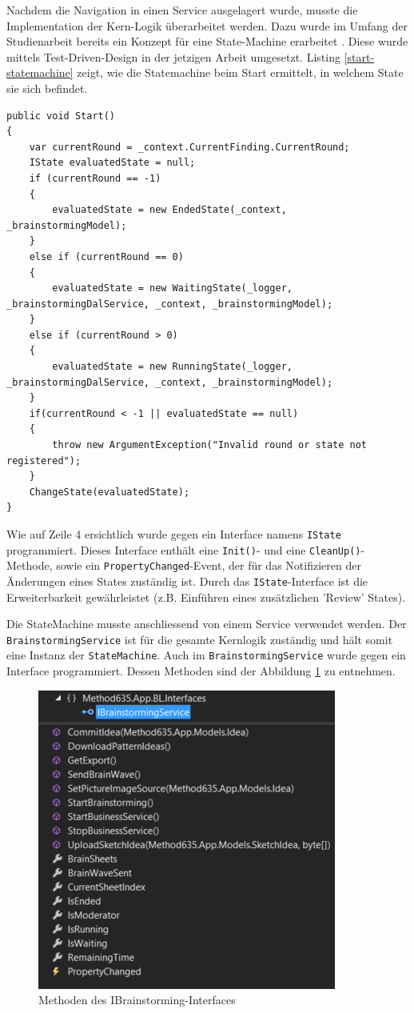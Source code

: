 Nachdem die Navigation in einen Service ausgelagert wurde, musste die Implementation der Kern-Logik überarbeitet werden. Dazu wurde im Umfang der Studienarbeit bereits ein Konzept für eine State-Machine erarbeitet \cite{methode635-sa}. Diese wurde mittels Test-Driven-Design in der jetzigen Arbeit umgesetzt. Listing \ref{start-statemachine} zeigt, wie die Statemachine beim Start ermittelt, in welchem State sie sich befindet.
\begin{lstlisting}[caption=Start der Klasse StateMachine, label=start-statemachine]
public void Start()
{
	var currentRound = _context.CurrentFinding.CurrentRound;
	IState evaluatedState = null;
	if (currentRound == -1)
	{
		evaluatedState = new EndedState(_context, _brainstormingModel);
	}
	else if (currentRound == 0)
	{
		evaluatedState = new WaitingState(_logger, _brainstormingDalService, _context, _brainstormingModel);
	}
	else if (currentRound > 0)
	{
		evaluatedState = new RunningState(_logger, _brainstormingDalService, _context, _brainstormingModel);
	}
	if(currentRound < -1 || evaluatedState == null)
	{
		throw new ArgumentException("Invalid round or state not registered");
	}
	ChangeState(evaluatedState);
}
\end{lstlisting}
Wie auf Zeile 4 ersichtlich wurde gegen ein Interface namens \texttt{IState} programmiert. Dieses Interface enthält eine \texttt{Init()}- und eine \texttt{CleanUp()}-Methode, sowie ein \texttt{PropertyChanged}-Event, der für das Notifizieren der Änderungen eines States zuständig ist. Durch das \texttt{IState}-Interface ist die Erweiterbarkeit gewährleistet (z.B. Einführen eines zusätzlichen 'Review' States). 

Die StateMachine musste anschliessend von einem Service verwendet werden. Der \texttt{BrainstormingService} ist für die gesamte Kernlogik zuständig und hält somit eine Instanz der \texttt{StateMachine}. Auch im \texttt{BrainstormingService} wurde gegen ein Interface programmiert. Dessen Methoden sind der Abbildung \ref{fig:ibrainstormingservice} zu entnehmen.

\begin{figure}[h]
	\centering
	\includegraphics[width=0.5\linewidth]{img/techn-bericht/ibrainstormingservice}
	\caption{Methoden des IBrainstorming-Interfaces}
	\label{fig:ibrainstormingservice}
\end{figure}

